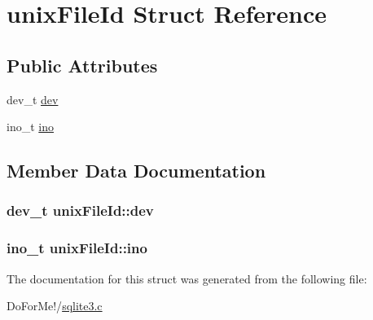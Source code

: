 \hypertarget{structunix_file_id}{\section{unix\-File\-Id Struct Reference}
\label{structunix_file_id}
}
\subsection*{Public Attributes}
\begin{DoxyCompactItemize}
\item 
dev\-\_\-t \hyperlink{structunix_file_id_acf703d95b9a1ae2f34affb7e9ae45e1b}{dev}
\item 
ino\-\_\-t \hyperlink{structunix_file_id_a2cc2d43e9d3f0a60810daa8fc353e692}{ino}
\end{DoxyCompactItemize}


\subsection{Member Data Documentation}
\hypertarget{structunix_file_id_acf703d95b9a1ae2f34affb7e9ae45e1b}{
\subsubsection[{dev}]{\setlength{\rightskip}{0pt plus 5cm}dev\-\_\-t unix\-File\-Id\-::dev}}\label{structunix_file_id_acf703d95b9a1ae2f34affb7e9ae45e1b}
\hypertarget{structunix_file_id_a2cc2d43e9d3f0a60810daa8fc353e692}{
\subsubsection[{ino}]{\setlength{\rightskip}{0pt plus 5cm}ino\-\_\-t unix\-File\-Id\-::ino}}\label{structunix_file_id_a2cc2d43e9d3f0a60810daa8fc353e692}


The documentation for this struct was generated from the following file\-:\begin{DoxyCompactItemize}
\item 
Do\-For\-Me!/\hyperlink{sqlite3_8c}{sqlite3.\-c}\end{DoxyCompactItemize}

